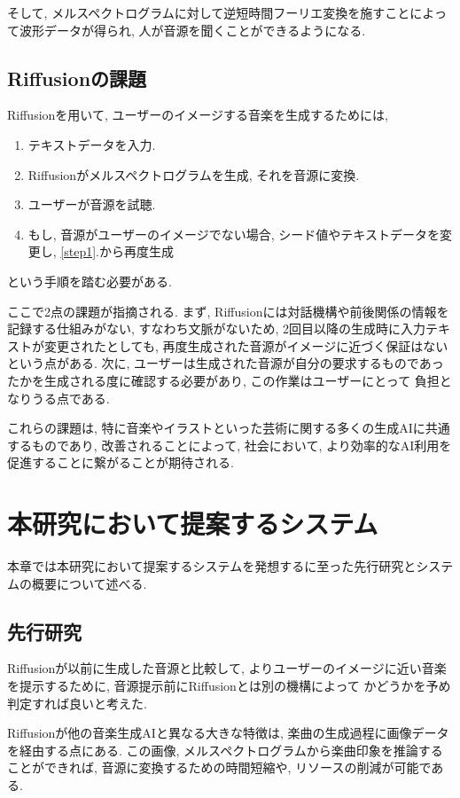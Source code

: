 \documentclass[a4paper,11pt,dvipdfmx]{jreport}
\begin{document}
そして, メルスペクトログラムに対して逆短時間フーリエ変換を施すことによって波形データが得られ, 
人が音源を聞くことができるようになる.

\newpage
\section{Riffusionの課題}
Riffusionを用いて, ユーザーのイメージする音楽を生成するためには, 
\begin{enumerate}
  \item テキストデータを入力.\label{step1}
  \item Riffusionがメルスペクトログラムを生成, それを音源に変換.
  \item ユーザーが音源を試聴.
  \item もし, 音源がユーザーのイメージでない場合, シード値やテキストデータを変更し, \ref{step1}.から再度生成
\end{enumerate}
という手順を踏む必要がある.

ここで2点の課題が指摘される.
まず, Riffusionには対話機構や前後関係の情報を記録する仕組みがない, すなわち文脈がないため, 2回目以降の生成時に入力テキストが変更されたとしても,
再度生成された音源がイメージに近づく保証はないという点がある.
次に, ユーザーは生成された音源が自分の要求するものであったかを生成される度に確認する必要があり, この作業はユーザーにとって
負担となりうる点である.

これらの課題は, 特に音楽やイラストといった芸術に関する多くの生成AIに共通するものであり, 
改善されることによって, 社会において, より効率的なAI利用を促進することに繋がることが期待される.

\newpage
\chapter{本研究において提案するシステム}
本章では本研究において提案するシステムを発想するに至った先行研究とシステムの概要について述べる.
\section{先行研究}
Riffusionが以前に生成した音源と比較して, よりユーザーのイメージに近い音楽を提示するために,
音源提示前にRiffusionとは別の機構によって
かどうかを予め判定すれば良いと考えた.

Riffusionが他の音楽生成AIと異なる大きな特徴は, 楽曲の生成過程に画像データを経由する点にある.
この画像, メルスペクトログラムから楽曲印象を推論することができれば, 
音源に変換するための時間短縮や, リソースの削減が可能である.
\end{document}
